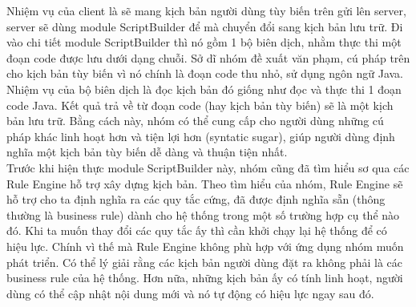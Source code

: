 \documentclass[12pt,a4paper,oneside]{extbook}
\begin{document}
%	
%	
%	
%	
%	
%	
%	
%	
%

\noindent
Nhiệm vụ của client là sẽ mang kịch bản người dùng tùy biến trên gửi lên server, server sẽ dùng module ScriptBuilder để mà chuyển đổi sang kịch bản lưu trữ. Đi vào chi tiết module ScriptBuilder thì nó gồm 1 bộ biên dịch, nhằm thực thi một đoạn code được lưu dưới dạng chuỗi. Sở dĩ nhóm đề xuất văn phạm, cú pháp trên cho kịch bản tùy biến vì nó chính là đoạn code thu nhỏ, sử dụng ngôn ngữ Java. Nhiệm vụ của bộ biên dịch là đọc kịch bản đó giống như đọc và thực thi 1 đoạn code Java. Kết quả trả về từ đoạn code (hay kịch bản tùy biến) sẽ là một kịch bản lưu trữ. Bằng cách này, nhóm có thể cung cấp cho người dùng những cú pháp khác linh hoạt hơn và tiện lợi hơn (syntatic sugar), giúp người dùng định nghĩa một kịch bản tùy biến dễ dàng và thuận tiện nhất.\\

\noindent
Trước khi hiện thực module ScriptBuilder này, nhóm cũng đã tìm hiểu sơ qua các Rule Engine hỗ trợ xây dựng kịch bản. Theo tìm hiểu của nhóm, Rule Engine sẽ hỗ trợ cho ta định nghĩa ra các quy tắc cứng, đã được định nghĩa sẵn (thông thường là business rule) dành cho hệ thống trong một số trường hợp cụ thể nào đó. Khi ta muốn thay đổi các quy tắc ấy thì cần khởi chạy lại hệ thống để có hiệu lực. Chính vì thế mà Rule Engine không phù hợp với ứng dụng nhóm muốn phát triển. Có thể lý giải rằng các kịch bản người dùng đặt ra không phải là các business rule của hệ thống. Hơn nữa, những kịch bản ấy có tính linh hoạt, người dùng có thể cập nhật nội dung mới và nó tự động có hiệu lực ngay sau đó.
\end{document}
